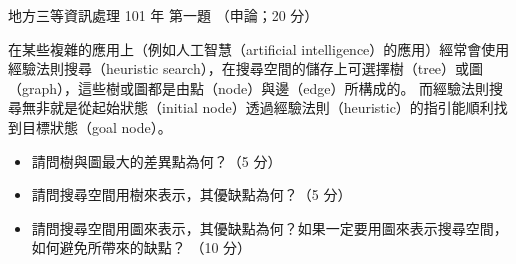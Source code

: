 \begin{pastexam}[label={px:df3-101-ds-01}]{地方三等資訊處理 101 年 第一題}
（申論；20 分）

在某些複雜的應用上（例如人工智慧（artificial intelligence）的應用）經常會使用經驗法則搜尋（heuristic
search），在搜尋空間的儲存上可選擇樹（tree）或圖（graph），這些樹或圖都是由點（node）與邊（edge）所構成的。
而經驗法則搜尋無非就是從起始狀態（initial node）透過經驗法則（heuristic）的指引能順利找到目標狀態（goal
node）。
\begin{itemize}[leftmargin=2.2em]
\item[㈠] 請問樹與圖最大的差異點為何？（5 分）
\item[㈡] 請問搜尋空間用樹來表示，其優缺點為何？（5 分）
\item[㈢] 請問搜尋空間用圖來表示，其優缺點為何？如果一定要用圖來表示搜尋空間，如何避免所帶來的缺點？
（10 分）
\end{itemize}
\end{pastexam}


